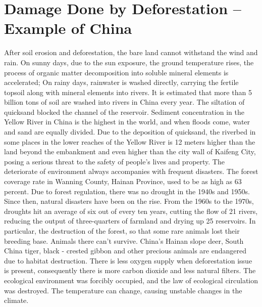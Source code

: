 \documentclass{book}\usepackage{knitr}
\begin{document}
\section{Damage Done by Deforestation – Example of China}
After soil erosion and deforestation, the bare land cannot withstand the wind and rain. On sunny days, due to the sun exposure, the ground temperature rises, the process of organic matter decomposition into soluble mineral elements is accelerated; On rainy days, rainwater is washed directly, carrying the fertile topsoil along with mineral elements into rivers. It is estimated that more than 5 billion tons of soil are washed into rivers in China every year. The siltation of quicksand blocked the channel of the reservoir. Sediment concentration in the Yellow River in China is the highest in the world, and when floods come, water and sand are equally divided. Due to the deposition of quicksand, the riverbed in some places in the lower reaches of the Yellow River is 12 meters higher than the land beyond the embankment and even higher than the city wall of Kaifeng City, posing a serious threat to the safety of people's lives and property.
The deteriorate of environment always accompanies with frequent disasters. The forest coverage rate in Wanning County, Hainan Province, used to be as high as 63 percent. Due to forest regulation, there was no drought in the 1940s and 1950s. Since then, natural disasters have been on the rise. From the 1960s to the 1970s, droughts hit an average of six out of every ten years, cutting the flow of 21 rivers, reducing the output of three-quarters of farmland and drying up 25 reservoirs. In particular, the destruction of the forest, so that some rare animals lost their breeding base. Animals there can't survive. China's Hainan slope deer, South China tiger, black - crested gibbon and other precious animals are endangered due to habitat destruction. There is less oxygen supply when deforestation issue is present, consequently there is more carbon dioxide and less natural filters. The ecological environment was forcibly occupied, and the law of ecological circulation was destroyed. The temperature can change, causing unstable changes in the climate.
\end{document}
